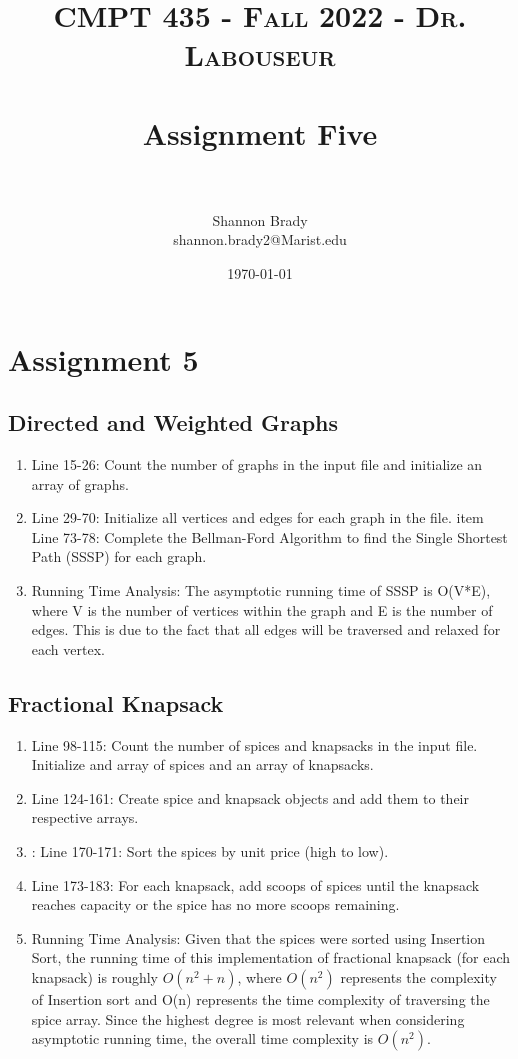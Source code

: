 \documentclass[letterpaper, 10pt,DIV=13]{scrartcl}
\title{	
   \normalfont \normalsize 
   \textsc{CMPT 435 - Fall 2022 - Dr. Labouseur} \\[10pt] %
   \horrule{0.5pt} \\[0.25cm] 	     %
   \huge Assignment Five  \\     	 %
   \horrule{0.5pt} \\[0.25cm] 	     %
}
\author{Shannon Brady \\ \normalsize shannon.brady2@Marist.edu}
\date{\normalsize\today} 	%
\numberwithin{equation}{section} %
\numberwithin{figure}{section} %
\numberwithin{table}{section} %
\begin{document}
\maketitle %

\section{Assignment 5}
\subsection{Directed and Weighted Graphs}
\begin{enumerate}
    \item Line 15-26: Count the number of graphs in the input file and initialize an array of graphs.
    \item Line 29-70: Initialize all vertices and edges for each graph in the file.
    item Line 73-78: Complete the Bellman-Ford Algorithm to find the Single Shortest Path (SSSP) for each graph.
    \item Running Time Analysis: The asymptotic running time of SSSP is O(V*E), where V is the number of vertices within the graph and E is the number of edges. This is due to the fact that all edges will be traversed and relaxed for each vertex.
\end{enumerate}
\subsection{Fractional Knapsack}
\begin{enumerate}
    \item Line 98-115: Count the number of spices and knapsacks in the input file. Initialize and array of spices and an array of knapsacks.
    \item Line 124-161: Create spice and knapsack objects and add them to their respective arrays.
    \item: Line 170-171: Sort the spices by unit price (high to low).
    \item Line 173-183: For each knapsack, add scoops of spices until the knapsack reaches capacity or the spice has no more scoops remaining.
    \item Running Time Analysis: Given that the spices were sorted using Insertion Sort, the running time of this implementation of fractional knapsack (for each knapsack) is roughly $O(n^2 + n)$, where $O(n^2)$ represents the complexity of Insertion sort and O(n) represents the time complexity of traversing the spice array. Since the highest degree is most relevant when considering asymptotic running time, the overall time complexity is $O(n^2)$.
\end{enumerate}
\end{document}
